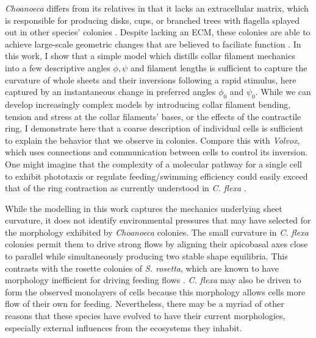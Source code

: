 \textit{Choanoeca} differs from its relatives in that it lacks an extracellular matrix, which is responsible for producing disks, cups, or branched trees with flagella splayed out in other species' colonies \citep{larson2020}. 
Despite lacking an ECM, these colonies are able to achieve large-scale geometric changes that are believed to faciliate function \citep{brunet2019}.
In this work, I show that a simple model which distills collar filament mechanics into a few descriptive angles $\phi, \psi$ and filament lengths is sufficient to capture the curvature of whole sheets and their inversions following a rapid stimulus, here captured by an instantaneous change in preferred angles $\phi_0$ and $\psi_0$.
While we can develop increasingly complex models by introducing collar filament bending, tension and stress at the collar filaments' bases, or the effects of the contractile ring, I demonstrate here that a coarse description of individual cells is sufficient to explain the behavior that we observe in colonies. 
Compare this with \textit{Volvox}, which uses connections and communication between cells to control its inversion. 
One might imagine that the complexity of a molecular pathway for a single cell to exhibit phototaxis or regulate feeding/swimming efficiency could easily exceed that of the ring contraction as currently understood in \textit{C. flexa} \citep{brunet2019}. 

While the modelling in this work captures the mechanics underlying sheet curvature, it does not identify environmental pressures that may have selected for the morphology exhibited by \textit{Choanoeca} colonies.
The small curvature in \textit{C. flexa} colonies permit them to drive strong flows by aligning their apicobasal axes close to parallel while simultaneously producing two stable shape equilibria.
This contrasts with the rosette colonies of \textit{S. rosetta}, which are known to have morphology inefficient for driving feeding flows \citep{kirkegaard2016}.
\textit{C. flexa} may also be driven to form the observed monolayers of cells because this morphology allows cells more flow of their own for feeding.
Nevertheless, there may be a myriad of other reasons that these species have evolved to have their current morphologies, especially external influences from the ecosystems they inhabit.

